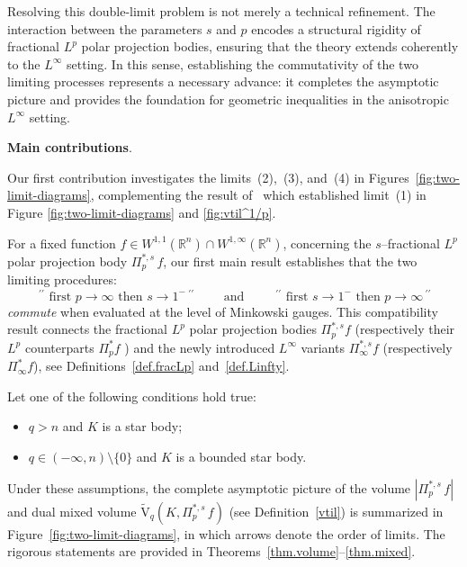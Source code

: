 \documentclass[11pt, reqno]{article}
\theoremstyle{definition}
\numberwithin{equation}{section}
\newcommand{\R}{\mathbb{R}}
\newcommand{\vtil}{\widetilde{\mathrm{V}}}
\begin{document}
\medskip


Resolving this double-limit problem is not merely a technical refinement. 
The interaction between the parameters $s$ and $p$ encodes a structural rigidity of fractional $L^p$ polar projection bodies, ensuring that the theory extends coherently to the $L^\infty$ setting. 
In this sense, establishing the commutativity of the two limiting processes represents a necessary advance: it completes the asymptotic picture and provides the foundation for geometric inequalities in the anisotropic $L^\infty$ setting. 

\medskip

\textbf{Main contributions}.

\medskip

Our first contribution investigates the limits~(2),~(3), and~(4) in Figures~\ref{fig:two-limit-diagrams}, complementing the result of~\cite{HL_2024, HL_2025} which established limit~(1) in Figure \ref{fig:two-limit-diagrams} and \ref{fig:vtil^1/p}.

\medskip

For a fixed function $f \in W^{1, 1}(\R^n) \cap W^{1, \infty}(\R^n)$, concerning the $s$--fractional $L^p$ polar projection body $\Pi^{\ast, s}_p \, f$, our first main result establishes that the two limiting procedures:
\[
\,^{\prime\prime} \text{ first } p \to \infty  \text{ then } s \to 1^{-} \,^{\prime\prime}
\qquad \text{ and } \qquad
\,^{\prime\prime} \text{ first } s \to 1^{-} \text{ then } p \to \infty \,^{\prime\prime}
\]
\emph{commute} when evaluated at the level of Minkowski gauges. 
This compatibility result connects the fractional \( L^p \) polar projection bodies \( \Pi^{\ast, s}_p f \) (respectively their $L^p$ counterparts \( \Pi^\ast_p f \) ) and the newly introduced \( L^\infty \) variants \( \Pi^{\ast, s}_\infty f \) (respectively \( \Pi^\ast_\infty f \)), see Definitions~\ref{def.fracLp} and~\ref{def.Linfty}.

\medskip

Let one of the following conditions hold true:
\begin{itemize}
	 \item[(a)] $q > n$ and $K$ is a star body;
	 \item[(b)] $q \in (- \infty, n) \setminus \{ 0 \}$ and $K$ is a bounded star body.
\end{itemize} 
Under these assumptions, the complete asymptotic picture of the volume $| \Pi^{\ast, s}_p \, f|$ and dual mixed volume $\vtil_q(K, \Pi^{\ast, s}_p \, f)$ (see Definition~\eqref{vtil}) is summarized in Figure~\ref{fig:two-limit-diagrams}, in which arrows denote the order of limits.
The rigorous statements are provided in Theorems~\ref{thm.volume}--\ref{thm.mixed}.
\end{document}
